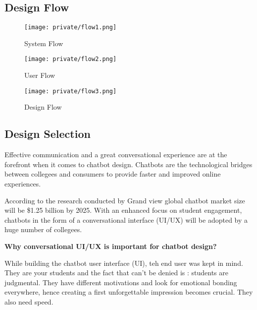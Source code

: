 \documentclass[14pt]{extarticle}
\begin{document}
\subsection{Design Flow}

\begin{figure}[!htb]
    \begin{center}
        \texttt{[image: private/flow1.png]}
    \end{center}
    \caption{System Flow}
\end{figure}


\begin{figure}[!htb]
    \begin{center}
        \texttt{[image: private/flow2.png]}
    \end{center}
    \caption{User Flow}
\end{figure}


\begin{figure}[!htb]
    \begin{center}
        \texttt{[image: private/flow3.png]}
    \end{center}
    \caption{Design Flow}
\end{figure}

\pagebreak

\subsection{Design Selection}

Effective communication and a great conversational experience are at the forefront when it comes to chatbot design. Chatbots are the technological bridges between collegees and consumers to provide faster and improved online experiences.

According to the research conducted by Grand view global chatbot market size will be \$1.25 billion by 2025. With an enhanced focus on student engagement, chatbots in the form of a conversational interface (UI/UX) will be adopted by a huge number of collegees.

\textbf{Why conversational UI/UX is important for chatbot design?}

While building the chatbot user interface (UI), teh end user was kept in mind. They are your students and the fact that can’t be denied is : students are judgmental. They have different motivations and look for emotional bonding everywhere, hence creating a first unforgettable impression becomes crucial. They also need speed.
\end{document}
